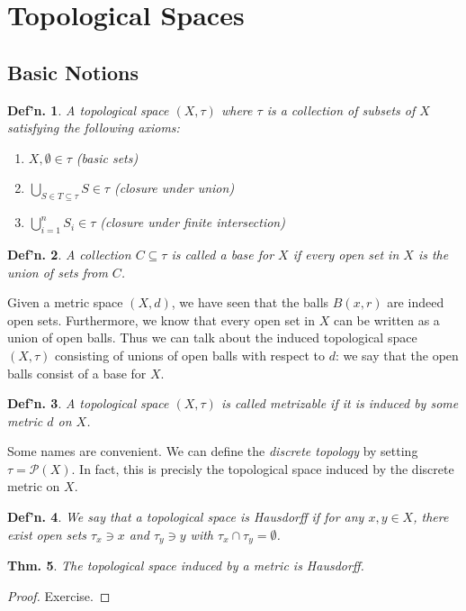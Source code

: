 \documentclass[12pt, a4paper]{book}
\newtheorem{theorem}{Thm.}[section]
\newtheorem{definition}[theorem]{Def'n.}
\theoremstyle{nonumberplain}
\newtheorem{proof}{Proof}
\begin{document}
\section{Topological Spaces}
\subsection{Basic Notions}
\begin{definition}
    A \textit{topological space} $(X,\tau)$ where $\tau$ is a collection of subsets of $X$ satisfying the following axioms:
    \begin{enumerate}
        \item $X,\emptyset\in\tau$ (basic sets)
        \item $\displaystyle\bigcup\limits_{S\in T\subseteq\tau}S\in\tau$ (closure under union)
        \item $\displaystyle\bigcup\limits_{i=1}^n S_i\in\tau$ (closure under finite intersection)
    \end{enumerate}
\end{definition}
\begin{definition}
    A collection $C\subseteq\tau$ is called a \textit{base} for $X$ if every open set in $X$ is the union of sets from $C$.
\end{definition}
Given a metric space $(X,d)$, we have seen that the balls $B(x,r)$ are indeed open sets.
Furthermore, we know that every open set in $X$ can be written as a union of open balls.
Thus we can talk about the induced topological space $(X,\tau)$ consisting of unions of open balls with respect to $d$: we say that the open balls consist of a base for $X$.
\begin{definition}
    A topological space $(X,\tau)$ is called \textit{metrizable} if it is induced by some metric $d$ on $X$.
\end{definition}
Some names are convenient.
We can define the \textit{discrete topology} by setting $\tau=\mathcal{P}(X)$.
In fact, this is precisly the topological space induced by the discrete metric on $X$.
\begin{definition}
    We say that a topological space is Hausdorff if for any $x,y\in X$, there exist open sets $\tau_x\ni x$ and $\tau_y\ni y$ with $\tau_x\cap\tau_y=\emptyset$.
\end{definition}
\begin{theorem}
    The topological space induced by a metric is Hausdorff.
\end{theorem}
\begin{proof}
    Exercise.
\end{proof}
\end{document}
